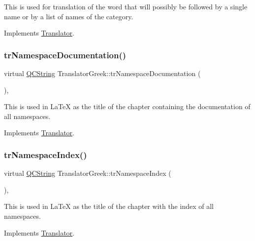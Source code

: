 This is used for translation of the word that will possibly be followed by a single name or by a list of names of the category. 

Implements \mbox{\hyperlink{class_translator}{Translator}}.

\mbox{\label{class_translator_greek_a05b26b5fada7f317227a4fd2fcc76b00}} 
\subsubsection{\texorpdfstring{trNamespaceDocumentation()}{trNamespaceDocumentation()}}
{\footnotesize\ttfamily virtual \mbox{\hyperlink{class_q_c_string}{Q\+C\+String}} Translator\+Greek\+::tr\+Namespace\+Documentation (\begin{DoxyParamCaption}{ }\end{DoxyParamCaption})\hspace{0.3cm}{\ttfamily [inline]}, {\ttfamily [virtual]}}

This is used in La\+TeX as the title of the chapter containing the documentation of all namespaces. 

Implements \mbox{\hyperlink{class_translator}{Translator}}.

\mbox{\label{class_translator_greek_aadd8a53b4412e5d98e3ce677de665815}} 
\subsubsection{\texorpdfstring{trNamespaceIndex()}{trNamespaceIndex()}}
{\footnotesize\ttfamily virtual \mbox{\hyperlink{class_q_c_string}{Q\+C\+String}} Translator\+Greek\+::tr\+Namespace\+Index (\begin{DoxyParamCaption}{ }\end{DoxyParamCaption})\hspace{0.3cm}{\ttfamily [inline]}, {\ttfamily [virtual]}}

This is used in La\+TeX as the title of the chapter with the index of all namespaces. 

Implements \mbox{\hyperlink{class_translator}{Translator}}.

